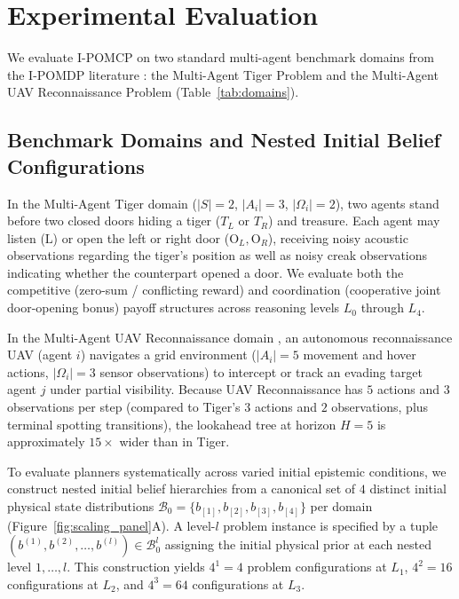 \section{Experimental Evaluation}
\label{sec:experiments}

We evaluate I-POMCP on two standard multi-agent benchmark domains from the I-POMDP literature \citep{gmytrasiewicz2005framework,doshi2009monte,zeng2012exploiting}: the Multi-Agent Tiger Problem and the Multi-Agent UAV Reconnaissance Problem (Table~\ref{tab:domains}).

\subsection{Benchmark Domains and Nested Initial Belief Configurations}

In the Multi-Agent Tiger domain ($|S|=2$, $|A_i|=3$, $|\Omega_i|=2$), two agents stand before two closed doors hiding a tiger ($T_L$ or $T_R$) and treasure. Each agent may listen ($\mathrm{L}$) or open the left or right door ($\mathrm{O}_L, \mathrm{O}_R$), receiving noisy acoustic observations regarding the tiger's position as well as noisy creak observations indicating whether the counterpart opened a door. We evaluate both the competitive (zero-sum / conflicting reward) and coordination (cooperative joint door-opening bonus) payoff structures across reasoning levels $L_0$ through $L_4$.

In the Multi-Agent UAV Reconnaissance domain \citep{doshi2009monte,zeng2012exploiting}, an autonomous reconnaissance UAV (agent $i$) navigates a grid environment ($|A_i|=5$ movement and hover actions, $|\Omega_i|=3$ sensor observations) to intercept or track an evading target agent $j$ under partial visibility. Because UAV Reconnaissance has $5$ actions and $3$ observations per step (compared to Tiger's $3$ actions and $2$ observations, plus terminal spotting transitions), the lookahead tree at horizon $H=5$ is approximately $15\times$ wider than in Tiger.

To evaluate planners systematically across varied initial epistemic conditions, we construct nested initial belief hierarchies from a canonical set of $4$ distinct initial physical state distributions $\mathcal{B}_0 = \{b_{[1]}, b_{[2]}, b_{[3]}, b_{[4]}\}$ per domain (Figure~\ref{fig:scaling_panel}A). A level-$l$ problem instance is specified by a tuple $(b^{(1)}, b^{(2)}, \dots, b^{(l)}) \in \mathcal{B}_0^l$ assigning the initial physical prior at each nested level $1, \dots, l$. This construction yields $4^1 = 4$ problem configurations at $L_1$, $4^2 = 16$ configurations at $L_2$, and $4^3 = 64$ configurations at $L_3$.

